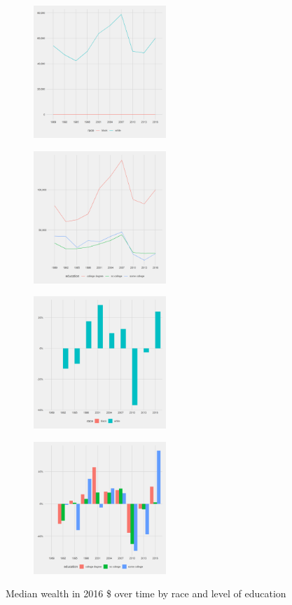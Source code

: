 \documentclass[]{scrartcl}
\begin{document}
\begin{figure}[h]
	\centering
	\begin{subfigure}{.49\textwidth}
		\centering
		\includegraphics[width=\linewidth, height=5cm]{../median hwealth finance_survey_bw _by race .png}
	\end{subfigure}
	\begin{subfigure}{.49\textwidth}
		\centering
		\includegraphics[width=\linewidth, height=5cm]{../median hwealth finance_survey_bw _by education .png}
	\end{subfigure}
	\begin{subfigure}{.49\textwidth}
	\centering
	\includegraphics[width=\linewidth, height=5cm]{../change_median hwealth finance_survey_bw _by race .png}
	\end{subfigure}
	\begin{subfigure}{.49\textwidth}
	\centering
	\includegraphics[width=\linewidth, height=5cm]{../change_median hwealth finance_survey_bw _by education .png}
	\end{subfigure}
	\caption{Median wealth in 2016 \$ over time by race and level of education}\label{fig:bw_htrends}
\end{figure}
\end{document}
